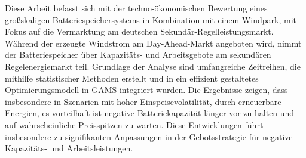 Diese Arbeit befasst sich mit der techno-ökonomischen Bewertung eines großskaligen Batteriespeichersystems
in Kombination mit einem Windpark, mit Fokus auf die Vermarktung am deutschen Sekundär-Regelleistungsmarkt.
Während der erzeugte Windstrom am Day-Ahead-Markt angeboten wird, nimmt der Batteriespeicher über Kapazitäts-
und Arbeitsgebote am sekundären Regelenergiemarkt teil. Grundlage der Analyse sind umfangreiche Zeitreihen, die mithilfe
statistischer Methoden erstellt und in ein effizient gestaltetes Optimierungsmodell in GAMS integriert wurden.
Die Ergebnisse zeigen, dass insbesondere in Szenarien mit hoher Einspeisevolatilität, durch erneuerbare Energien,
es vorteilhaft ist negative Batteriekapazität länger vor zu halten und auf wahrscheinliche Preisspitzen zu warten.
Diese Entwicklungen führt insbesondere zu signifikanten Anpassungen in der Gebotsstrategie für negative Kapazitäts-
und Arbeitsleistungen.